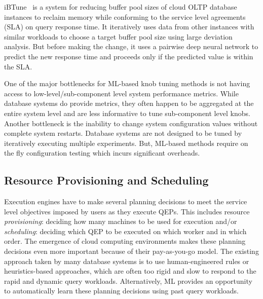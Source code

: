 iBTune~\cite{ibtune} is a system for reducing buffer pool sizes of cloud OLTP database instances to reclaim memory while conforming to the service level agreements (SLA) on query response time.
It iteratively uses data from other instances with similar workloads to choose a target buffer pool size using large deviation analysis.
But before making the change, it uses a pairwise deep neural network to predict the new response time and proceeds only if the predicted value is within the SLA.

One of the major bottlenecks for ML-based knob tuning methods is not having access to low-level/sub-component level system performance metrics.
While database systems do provide metrics, they often happen to be aggregated at the entire system level and are less informative to tune sub-component level knobs.
Another bottleneck is the inability to change system configuration values without complete system restarts.
Database systems are not designed to be tuned by iteratively executing multiple experiments. 
But, ML-based methods require on the fly configuration testing which incurs significant overheads.

\subsection{Resource Provisioning and Scheduling}
Execution engines have to make several planning decisions to meet the service level objectives imposed by users as they execute QEPs.
This includes resource \textit{provisioning}: deciding how many machines to be used for execution and/or \textit{scheduling}: deciding which QEP to be executed on which worker and in which order.
The emergence of cloud computing environments makes these planning decisions even more important because of their pay-as-you-go model.
The existing approach taken by many database systems is to use human-engineered rules or heuristics-based approaches, which are often too rigid and slow to respond to the rapid and dynamic query workloads.
Alternatively, ML provides an opportunity to automatically learn these planning decisions using past query workloads.

